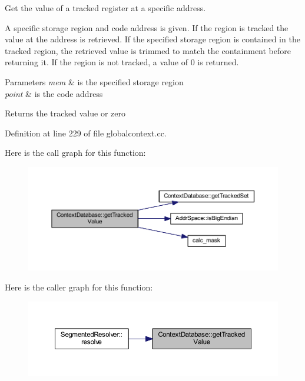 Get the value of a tracked register at a specific address. 

A specific storage region and code address is given. If the region is tracked the value at the address is retrieved. If the specified storage region is contained in the tracked region, the retrieved value is trimmed to match the containment before returning it. If the region is not tracked, a value of 0 is returned. 
\begin{DoxyParams}{Parameters}
{\em mem} & is the specified storage region \\
\hline
{\em point} & is the code address \\
\hline
\end{DoxyParams}
\begin{DoxyReturn}{Returns}
the tracked value or zero 
\end{DoxyReturn}


Definition at line 229 of file globalcontext.\+cc.

Here is the call graph for this function\+:
\nopagebreak
\begin{figure}[H]
\begin{center}
\leavevmode
\includegraphics[width=350pt]{class_context_database_a4e4ffd9c15465a2503ddc38a54caab61_cgraph}
\end{center}
\end{figure}
Here is the caller graph for this function\+:
\nopagebreak
\begin{figure}[H]
\begin{center}
\leavevmode
\includegraphics[width=350pt]{class_context_database_a4e4ffd9c15465a2503ddc38a54caab61_icgraph}
\end{center}
\end{figure}
\mbox{\label{class_context_database_a1ebd1d177e17c5ea1e877f8b1d8c581d}} 
